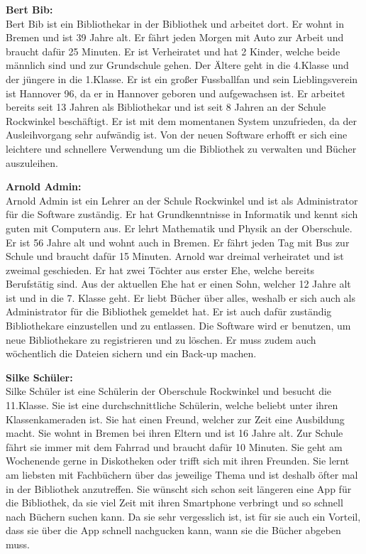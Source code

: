 \documentclass[fontsize=12pt,paper=a4,twoside]{scrartcl}
\begin{document}
\textbf{Bert Bib:}\\
Bert Bib ist ein Bibliothekar in der Bibliothek und arbeitet dort. Er wohnt in Bremen und ist 39 Jahre alt. Er fährt jeden Morgen mit Auto zur Arbeit und braucht dafür 25 Minuten. Er ist Verheiratet und hat 2 Kinder, welche beide männlich sind und zur Grundschule gehen. Der Ältere geht in die 4.Klasse und der jüngere in die 1.Klasse. Er ist ein großer Fussballfan und sein Lieblingsverein ist Hannover 96, da er in Hannover geboren und aufgewachsen ist. Er arbeitet bereits seit 13 Jahren als Bibliothekar und ist seit 8 Jahren an der Schule Rockwinkel beschäftigt. Er ist mit dem momentanen System unzufrieden, da der Ausleihvorgang sehr aufwändig ist. Von der neuen Software erhofft er sich eine leichtere und schnellere Verwendung um die Bibliothek zu verwalten und Bücher auszuleihen. \\

\bigskip

\textbf{Arnold Admin:}\\
Arnold Admin ist ein Lehrer an der Schule Rockwinkel und ist als Administrator für die Software zuständig. Er hat Grundkenntnisse in Informatik und kennt sich guten mit Computern aus. Er lehrt Mathematik und Physik an der Oberschule. Er ist 56 Jahre alt und wohnt auch in Bremen. Er fährt jeden Tag mit Bus zur Schule und braucht dafür 15 Minuten. Arnold war dreimal verheiratet und ist zweimal geschieden. Er hat zwei Töchter aus erster Ehe, welche bereits Berufstätig sind. Aus der aktuellen Ehe hat er einen Sohn, welcher 12 Jahre alt ist und in die 7. Klasse geht. Er liebt Bücher über alles, weshalb er sich auch als Administrator für die Bibliothek gemeldet hat. Er ist auch dafür zuständig Bibliothekare einzustellen und zu entlassen. Die Software wird er benutzen, um neue Bibliothekare zu registrieren und zu löschen. Er muss zudem auch wöchentlich die Dateien sichern und ein Back-up machen.\\

\bigskip

\textbf{Silke Schüler:}\\
Silke Schüler ist eine Schülerin der Oberschule Rockwinkel und besucht die 11.Klasse. Sie ist eine durchschnittliche Schülerin, welche beliebt unter ihren Klassenkameraden ist. Sie hat einen Freund, welcher zur Zeit eine Ausbildung macht. Sie wohnt in Bremen bei ihren Eltern und ist 16 Jahre alt. Zur Schule fährt sie immer mit dem Fahrrad und braucht dafür 10 Minuten. Sie geht am Wochenende gerne in Diskotheken oder trifft sich mit ihren Freunden. Sie lernt am liebsten mit Fachbüchern über das jeweilige Thema und ist deshalb öfter mal in der Bibliothek anzutreffen. Sie wünscht sich schon seit längeren eine App für die Bibliothek, da sie viel Zeit mit ihren Smartphone verbringt und so schnell nach Büchern suchen kann. Da sie sehr vergesslich ist, ist für sie auch ein Vorteil, dass sie über die App schnell nachgucken kann, wann sie die Bücher abgeben muss.\\
\end{document}
